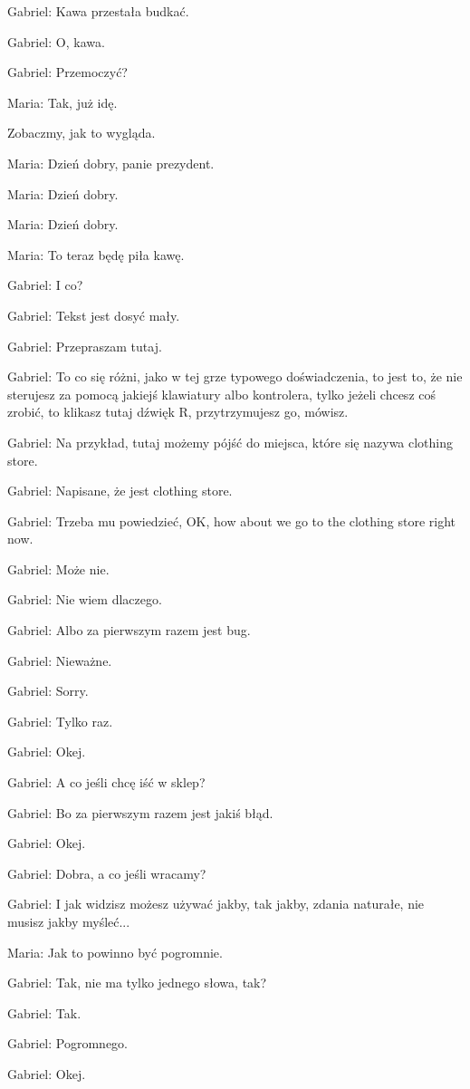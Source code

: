Gabriel: Kawa przestała budkać.

Gabriel: O, kawa.

Gabriel: Przemoczyć?

Maria: Tak, już idę.

Zobaczmy, jak to wygląda.

Maria: Dzień dobry, panie prezydent.

Maria: Dzień dobry.

Maria: Dzień dobry.

Maria: To teraz będę piła kawę.

Gabriel: I co?

Gabriel: Tekst jest dosyć mały.

Gabriel: Przepraszam tutaj.

Gabriel: To co się różni, jako w tej grze typowego doświadczenia, to jest to, że nie sterujesz za pomocą jakiejś klawiatury albo kontrolera, tylko jeżeli chcesz coś zrobić, to klikasz tutaj dźwięk R, przytrzymujesz go, mówisz.

Gabriel: Na przykład, tutaj możemy pójść do miejsca, które się nazywa clothing store.

Gabriel: Napisane, że jest clothing store.

Gabriel: Trzeba mu powiedzieć, OK, how about we go to the clothing store right now.

Gabriel: Może nie.

Gabriel: Nie wiem dlaczego.

Gabriel: Albo za pierwszym razem jest bug.

Gabriel: Nieważne.

Gabriel: Sorry.

Gabriel: Tylko raz.

Gabriel: Okej.

Gabriel: A co jeśli chcę iść w sklep?

Gabriel: Bo za pierwszym razem jest jakiś błąd.

Gabriel: Okej.

Gabriel: Dobra, a co jeśli wracamy?

Gabriel: I jak widzisz możesz używać jakby, tak jakby, zdania naturałe, nie musisz jakby myśleć...

Maria: Jak to powinno być pogromnie.

Gabriel: Tak, nie ma tylko jednego słowa, tak?

Gabriel: Tak.

Gabriel: Pogromnego.

Gabriel: Okej.

